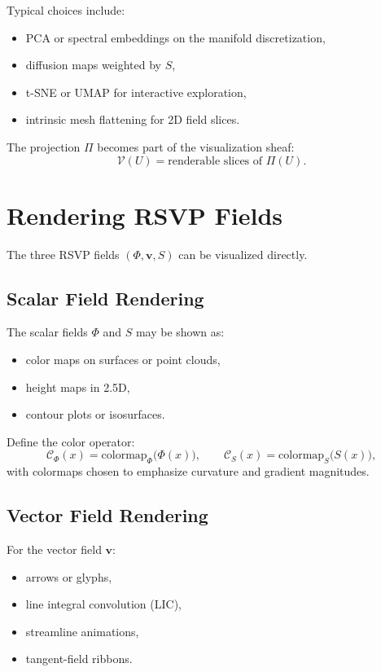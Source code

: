 Typical choices include:
\begin{itemize}
\item PCA or spectral embeddings on the manifold discretization,
\item diffusion maps weighted by $S$,
\item t-SNE or UMAP for interactive exploration,
\item intrinsic mesh flattening for 2D field slices.
\end{itemize}

The projection $\Pi$ becomes part of the visualization sheaf:
\[
  \mathscr{V}(U) = \text{renderable slices of } \Pi(U).
\]


\section{Rendering RSVP Fields}

The three RSVP fields $(\Phi,\mathbf{v},S)$ can be visualized directly.

\subsection{Scalar Field Rendering}

The scalar fields $\Phi$ and $S$ may be shown as:
\begin{itemize}
\item color maps on surfaces or point clouds,
\item height maps in 2.5D,
\item contour plots or isosurfaces.
\end{itemize}

Define the color operator:
\[
  \mathcal{C}_\Phi(x)
    = \mathrm{colormap}_\Phi\big(\Phi(x)\big),
\qquad
  \mathcal{C}_S(x)
    = \mathrm{colormap}_S\big(S(x)\big),
\]
with colormaps chosen to emphasize curvature and gradient magnitudes.

\subsection{Vector Field Rendering}

For the vector field $\mathbf{v}$:
\begin{itemize}
\item arrows or glyphs,
\item line integral convolution (LIC),
\item streamline animations,
\item tangent-field ribbons.
\end{itemize}

